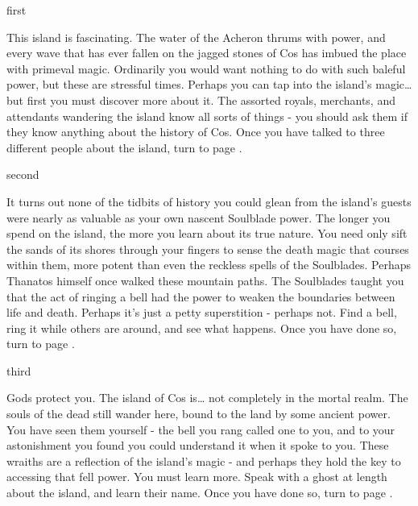 \documentclass[greennotebook]{Kos}
\begin{document}
\startnotebook{\nButler{}}

\begin{page}{first}

This island is fascinating. The water of the Acheron thrums with power, and every wave that has ever fallen on the jagged stones of Cos has imbued the place with primeval magic. Ordinarily you would want nothing to do with such baleful power, but these are stressful times. Perhaps you can tap into the island’s magic… but first you must discover more about it. The assorted royals, merchants, and attendants wandering the island know all sorts of things - you should ask them if they know anything about the history of Cos. Once you have talked to three different people about the island, turn to page .

\end{page}

\begin{page}{second}

It turns out none of the tidbits of history you could glean from the island’s guests were nearly as valuable as your own nascent Soulblade power. The longer you spend on the island, the more you learn about its true nature. You need only sift the sands of its shores through your fingers to sense the death magic that courses within them, more potent than even the reckless spells of the Soulblades. Perhaps Thanatos himself once walked these mountain paths. The Soulblades taught you that the act of ringing a bell had the power to weaken the boundaries between life and death. Perhaps it’s just a petty superstition - perhaps not. Find a bell, ring it while others are around, and see what happens. Once you have done so, turn to page .

\end{page}

\begin{page}{third}

Gods protect you. The island of Cos is… not completely in the mortal realm. The souls of the dead still wander here, bound to the land by some ancient power. You have seen them yourself - the bell you rang called one to you, and to your astonishment you found you could understand it when it spoke to you. These wraiths are a reflection of the island’s magic - and perhaps they hold the key to accessing that fell power. You must learn more. Speak with a ghost at length about the island, and learn their name. Once you have done so, turn to page .

\end{page}
\end{document}
